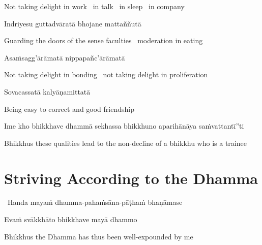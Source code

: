 \begin{english}
  Not taking delight in work \breathmark\ in talk \breathmark\ in sleep \breathmark\ in company
\end{english}

Indriyesu guttadvāratā bhojane mattaññutā

\begin{english}
  Guarding the doors of the sense faculties \breathmark\ moderation in eating
\end{english}

Asaṁsagg'ārāmatā nippapañc'ārāmatā

\begin{english}
  Not taking delight in bonding \breathmark\ not taking delight in proliferation
\end{english}

Sovacassatā kalyāṇamittatā

\begin{english}
  Being easy to correct and good friendship
\end{english}

\begin{pali-hang}
  Ime kho bhikkhave dhammā sekhassa bhikkhuno aparihānāya saṁvattantī''ti
\end{pali-hang}

\begin{english-hang}
  Bhikkhus these qualities lead to the non-decline of a bhikkhu who is a trainee
\end{english-hang}

\suttaRef{[AN 6.22 \& AN 8.79]}


\section{Striving According to the Dhamma}
\label{striving-according-to-dhamma}

\begin{leader}
  \anglebracketleft\ \hspace{-0.5mm}Handa mayaṁ dhamma-pahaṁsāna-pāṭhaṁ bhaṇāmase \hspace{-0.5mm}\anglebracketright\
\end{leader}

Evaṁ svākkhāto bhikkhave mayā dhammo

\begin{english}
  Bhikkhus the Dhamma has thus been well-expounded by me
\end{english}

